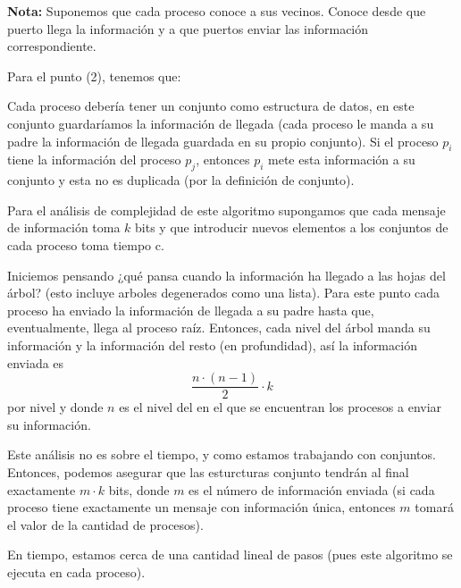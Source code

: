 \textbf{Nota:} Suponemos que cada proceso conoce a sus vecinos.
Conoce desde que puerto llega la información y a que puertos
enviar las información correspondiente.
\newline

\hspace*{0.3cm} Para el punto (2), tenemos que:

Cada proceso debería tener un conjunto como estructura
de datos, en este conjunto guardaríamos la información
de llegada (cada proceso le manda a su padre la información
de llegada guardada en su propio conjunto). Si el proceso
$p_i$ tiene la información del proceso $p_j$, entonces $p_i$
mete esta información a su conjunto y esta no es duplicada
(por la definición de conjunto).
\newline

Para el análisis de complejidad de este algoritmo supongamos
que cada mensaje de información toma $k$ bits y que introducir
nuevos elementos a los conjuntos de cada proceso toma tiempo c.

Iniciemos pensando ¿qué pansa cuando la información ha llegado
a las hojas del árbol? (esto incluye arboles degenerados como una
lista). Para este punto cada proceso ha enviado la información de
llegada a su padre hasta que, eventualmente, llega al proceso raíz.
Entonces, cada nivel del árbol manda su información y la información
del resto (en profundidad), así la información enviada es
\[\frac{n \cdot (n - 1)}{2} \cdot k\]
por nivel y donde $n$ es el nivel del en el que se encuentran los
procesos a enviar su información.

Este análisis no es sobre el tiempo, y como estamos trabajando con
conjuntos. Entonces, podemos asegurar que las esturcturas conjunto
tendrán al final exactamente $m \cdot k$ bits, donde $m$ es el número
de información enviada (si cada proceso tiene exactamente un mensaje
con información única, entonces $m$ tomará el valor de la cantidad
de procesos).

En tiempo, estamos cerca de una cantidad lineal de pasos (pues este algoritmo
se ejecuta en cada proceso).
